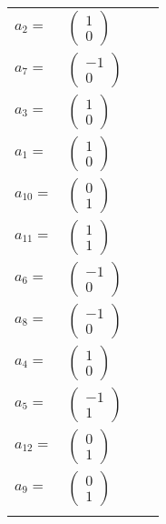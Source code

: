 \documentclass[1p]{elsarticle_modified}
\theoremstyle{definition}
\begin{document}
\begin{tabular}{m{7pt} m{180pt} m{7pt} m{180pt} }
\flushright $a_{2}=$&$\begin{pmatrix}1\\0\end{pmatrix}$ \\
\flushright $a_{7}=$&$\begin{pmatrix}-1\\0\end{pmatrix}$ \\
\flushright $a_{3}=$&$\begin{pmatrix}1\\0\end{pmatrix}$ \\
\flushright $a_{1}=$&$\begin{pmatrix}1\\0\end{pmatrix}$ \\
\flushright $a_{10}=$&$\begin{pmatrix}0\\1\end{pmatrix}$ \\
\flushright $a_{11}=$&$\begin{pmatrix}1\\1\end{pmatrix}$ \\
\flushright $a_{6}=$&$\begin{pmatrix}-1\\0\end{pmatrix}$ \\
\flushright $a_{8}=$&$\begin{pmatrix}-1\\0\end{pmatrix}$ \\
\flushright $a_{4}=$&$\begin{pmatrix}1\\0\end{pmatrix}$ \\
\flushright $a_{5}=$&$\begin{pmatrix}-1\\1\end{pmatrix}$ \\
\flushright $a_{12}=$&$\begin{pmatrix}0\\1\end{pmatrix}$ \\
\flushright $a_{9}=$&$\begin{pmatrix}0\\1\end{pmatrix}$\\&\end{tabular}
\end{document}

